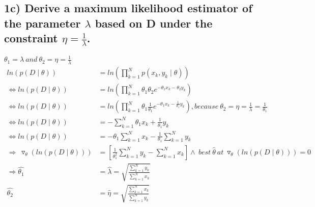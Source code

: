 \subsection*{1c) Derive a maximum likelihood estimator of the parameter $\lambda$ based on D under the constraint $\eta = \frac{1}{\lambda}$.
}
$\theta_1=\lambda\ and\ \theta_2=\eta=\frac{1}{\lambda}$
\begin{align*}
    ln(p(D\mid\theta))&=ln(\prod_{k=1}^N p(x_k, y_k\mid \theta))\\
    \Leftrightarrow ln(p(D\mid\theta))&=ln(\prod_{k=1}^N \theta_1\theta_2 e^{-\theta_1 x_k-\theta_2 y_k})\\
    \Leftrightarrow ln(p(D\mid\theta))&=ln(\prod_{k=1}^N \theta_1\frac{1}{\theta_1} e^{-\theta_1 x_k-\frac{1}{\theta_1} y_k}), because\  \theta_2=\eta=\frac{1}{\lambda}=\frac{1}{\theta_1}\\
    \Leftrightarrow ln(p(D\mid\theta))&=-\sum_{k=1}^N \theta_1 x_k+\frac{1}{\theta_1} y_k\\
    \Leftrightarrow ln(p(D\mid\theta))&=-\theta_1\sum_{k=1}^N x_k - \frac{1}{\theta_1}\sum_{k=1}^N y_k\\
    \Rightarrow\ \triangledown_\theta(ln(p(D\mid\theta)))&=\left[\frac{1}{\theta_1^2}\sum_{k=1}^N y_k-\sum_{k=1}^N x_k\right] \land\ best\ \hat{\theta}\ at\  \triangledown_\theta(ln(p(D\mid\theta)))=0\\
    \Rightarrow \hat{\theta_1}&=\hat{\lambda}=\sqrt{\frac{\sum_{k=1}^N y_k}{\sum_{k=1}^N x_k}}\\
    \hat{\theta_2}&=\hat{\eta}=\sqrt{\frac{\sum_{k=1}^N x_k}{\sum_{k=1}^N y_k}}
\end{align*}

